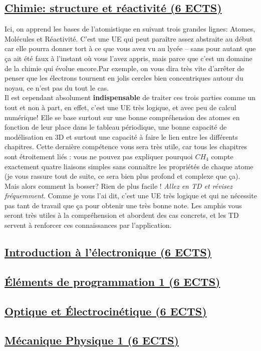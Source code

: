 \documentclass[]{report}
\begin{document}
\subsection{\quad \underline{Chimie: structure et réactivité (6 ECTS)}}
Ici, on apprend les bases de l'atomistique en suivant trois grandes lignes: Atomes, Molécules et Réactivité. C'est une UE qui peut paraître assez abstraite au début car elle pourra donner tort à ce que vous avez vu au lycée -- sans pour autant que ça ait été faux à l'instant où vous l'avez appris, mais parce que c'est un domaine de la chimie qui évolue encore.Par exemple, on vous dira très vite d'arrêter de penser que les électrons tournent en jolis cercles bien concentriques autour du noyau, ce n'est pas du tout le cas.\smallskip \\ 
Il est cependant absolument \textbf{indispensable} de traiter ces trois parties comme un tout et non à part, en effet, c'est une UE très logique, et avec peu de calcul numérique! Elle se base surtout sur une bonne compréhension des atomes en fonction de leur place dans le tableau périodique, une bonne capacité de modélisation en 3D et surtout une capacité à faire le lien entre les différents chapitres. Cette dernière compétence vous sera très utile, car tous les chapitres sont étroitement liés : vous ne pouvez pas expliquer pourquoi $CH_4$ compte exactement quatre liaisons simples sans connaître les propriétés de chaque atome (je vous rassure tout de suite, ce sera bien plus profond et complexe que ça). \newpage
Mais alors comment la bosser? Rien de plus facile ! \emph{Allez en TD et révisez fréquemment.} Comme je vous l'ai dit, c'est une UE très logique et qui ne nécessite pas tant de travail que ça pour obtenir une très bonne note. Les amphis vous seront très utiles à la compréhension et abordent des cas concrets, et les TD servent à renforcer ces connaissances par l'application.
\subsection{\quad \underline{Introduction à l'électronique (6 ECTS)}}
\subsection{\quad \underline{Éléments de programmation 1 (6 ECTS)}}
\subsection{\quad \underline{Optique et Électrocinétique (6 ECTS)}}
\subsection{\quad \underline{Mécanique Physique 1 (6 ECTS)}}
\end{document}
